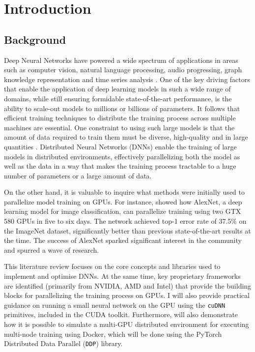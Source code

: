 \section{Introduction}
\label{sec:intro}

\subsection{Background}
Deep Neural Networks have powered a wide spectrum of applications in areas such as computer vision,
natural language processing, audio progressing, graph knowledge representation and time series
analysis \cite{noauthor_papers_nodate}. One of the key driving factors that enable the application
of deep learning models in such a wide range of domains, while still ensuring formidable
state-of-the-art performance, is the ability to scale-out models to millions or billions of
parameters. It follows that efficient training techniques to distribute the training process across
multiple machines are essential. One constraint to using such large models is that the amount of
data required to train them must be diverse, high-quality and in large quantities
\cite{ben-nun_demystifying_2020, dehghani_distributed_2023, langer_distributed_2020}. Distributed
Neural Networks (DNNs) enable the training of large models in distributed environments, effectively
parallelizing both the model as well as the data in a way that makes the training process tractable
to a huge number of parameters or a large amount of data.

On the other hand, it is valuable to inquire what methods were initially used to parallelize model
training on GPUs. For instance, \cite{krizhevsky_imagenet_2012} showed how AlexNet, a deep learning
model for image classification, can parallelize training using two GTX 580 GPUs in five to six
days. The network achieved top-1 error rate of 37.5\% on the ImageNet dataset, significantly better
than previous state-of-the-art results at the time. The success of AlexNet sparked significant
interest in the community and spurred a wave of research.

This literature review focuses on the core concepts and libraries used to implement and optimise
DNNs. At the same time, key proprietary frameworks are identified (primarily from NVIDIA, AMD and
Intel) that provide the building blocks for parallelizing the training process on GPUs. I will also
provide practical guidance on running a small neural network on the GPU using the \texttt{cuDNN}
primitives, included in the CUDA toolkit. Furthermore, will also demonstrate how it is possible to
simulate a multi-GPU distributed environment for executing multi-node training using Docker, which
will be done using the PyTorch Distributed Data Parallel (\texttt{DDP}) library.

